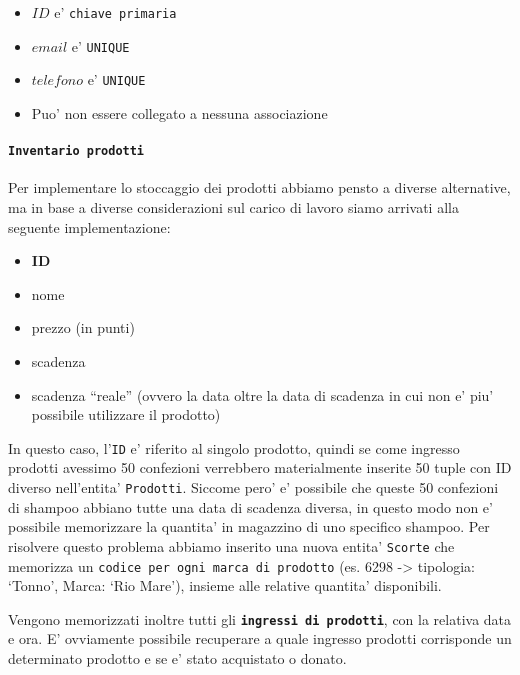 \documentclass[]{article}
\providecommand{\tightlist}{%
  \setlength{\itemsep}{0pt}\setlength{\parskip}{0pt}}
\let\oldparagraph\paragraph
\renewcommand{\paragraph}[1]{\oldparagraph{#1}\mbox{}}
\begin{document}
\begin{itemize}
\tightlist
\item
  \(ID\) e' \texttt{chiave\ primaria}
\item
  \(email\) e' \texttt{UNIQUE}
\item
  \(telefono\) e' \texttt{UNIQUE}
\item
  Puo' non essere collegato a nessuna associazione
\end{itemize}

\hypertarget{inventario-prodotti}{%
\paragraph{\texorpdfstring{\texttt{Inventario\ prodotti}}{Inventario prodotti}}\label{inventario-prodotti}}

Per implementare lo stoccaggio dei prodotti abbiamo pensto a diverse
alternative, ma in base a diverse considerazioni sul carico di lavoro
siamo arrivati alla seguente implementazione:

\begin{itemize}
\tightlist
\item
  \textbf{ID}
\item
  nome
\item
  prezzo (in punti)
\item
  scadenza
\item
  scadenza ``reale'' (ovvero la data oltre la data di scadenza in cui
  non e' piu' possibile utilizzare il prodotto)
\end{itemize}

In questo caso, l'\texttt{ID} e' riferito al singolo prodotto, quindi se
come ingresso prodotti avessimo 50 confezioni verrebbero materialmente
inserite 50 tuple con ID diverso nell'entita' \texttt{Prodotti}. Siccome
pero' e' possibile che queste 50 confezioni di shampoo abbiano tutte una
data di scadenza diversa, in questo modo non e' possibile memorizzare la
quantita' in magazzino di uno specifico shampoo. Per risolvere questo
problema abbiamo inserito una nuova entita'
\texttt{\textquotesingle{}Scorte\textquotesingle{}} che memorizza un
\texttt{codice\ per\ ogni\ marca\ di\ prodotto} (es. 6298
-\textgreater{} tipologia: `Tonno', Marca: `Rio Mare'), insieme alle
relative quantita' disponibili.

Vengono memorizzati inoltre tutti gli
\textbf{\texttt{ingressi\ di\ prodotti}}, con la relativa data e ora. E'
ovviamente possibile recuperare a quale ingresso prodotti corrisponde un
determinato prodotto e se e' stato acquistato o donato.
\end{document}
